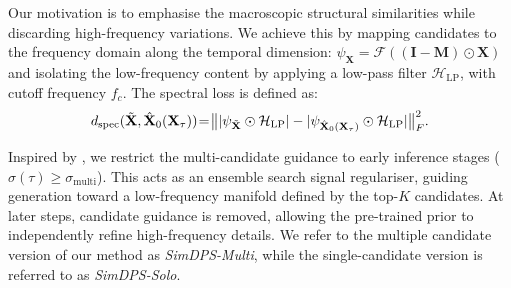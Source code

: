 \documentclass{article}
\begin{document}
Our motivation is to emphasise the macroscopic structural similarities while discarding high-frequency variations.
We achieve this by mapping candidates to the frequency domain along the temporal dimension:
$\psi_\mathbf{X} = \mathcal{F}( (\mathbf{I} - \mathbf{M}) \odot\mathbf{X})$
and isolating the low-frequency content by applying a low-pass filter $\mathcal{H}_\mathrm{LP}$, with cutoff frequency $f_c$.
The spectral loss is defined as:
\begin{equation}
 d_\mathrm{spec}(\tilde{\mathbf{X}}, \hat{\mathbf{X}}_0(\mathbf{X}_\tau))
 \hspace{-2pt}
 =
 \hspace{-2pt}
 \big\lVert |\psi_{\tilde{\mathbf{X}}} \odot \mathcal{H}_\mathrm{LP}| - |\psi_{\hat{\mathbf{X}}_0(\mathbf{X}_\tau)} \odot \mathcal{H}_\mathrm{LP}| \big\rVert^2_F  .
\end{equation}

Inspired by \cite{falck2025fourier}, we restrict the multi-candidate guidance to early inference stages ($\sigma(\tau) \geq \sigma_\mathrm{multi}$). This acts as an ensemble search signal regulariser, guiding generation toward a low-frequency manifold defined by the top-$K$ candidates. At later steps, candidate guidance is removed, allowing the pre-trained prior to independently refine high-frequency details. We refer to the multiple candidate version of our method as \textit{SimDPS-Multi}, while the single-candidate version is referred to as  \textit{SimDPS-Solo}.
\end{document}
